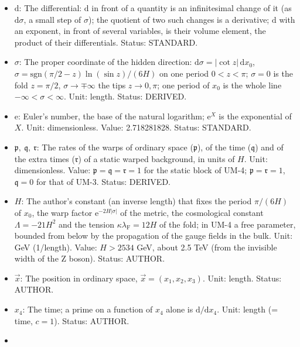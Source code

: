 \documentclass[
  10pt,
]{article}
\providecommand{\tightlist}{%
  \setlength{\itemsep}{0pt}\setlength{\parskip}{0pt}}
\begin{document}
\begin{itemize}
\tightlist
\item
  \(\mathrm{d}\): The differential: \(\mathrm{d}\) in front of a
  quantity is an infinitesimal change of it (as \(\mathrm{d}\sigma\), a
  small step of \(\sigma\)); the quotient of two such changes is a
  derivative; \(\mathrm{d}\) with an exponent, in front of several
  variables, is their volume element, the product of their
  differentials. Status: STANDARD.
\item
  \(\sigma\): The proper coordinate of the hidden direction:
  \(\mathrm{d}\sigma = \lvert\cot z\rvert\,\mathrm{d}x_0\),
  \(\sigma = \mathrm{sgn}(\pi/2 - z)\ln(\sin z)/(6H)\) on one period
  \(0 < z < \pi\); \(\sigma = 0\) is the fold \(z = \pi/2\),
  \(\sigma \to \mp\infty\) the tips \(z \to 0, \pi\); one period of
  \(x_0\) is the whole line \(-\infty < \sigma < \infty\). Unit: length.
  Status: DERIVED.
\item
  \(\mathrm{e}\): Euler's number, the base of the natural logarithm;
  \(\mathrm{e}^{X}\) is the exponential of \(X\). Unit: dimensionless.
  Value: 2.718281828. Status: STANDARD.
\item
  \(\mathfrak{p},\ \mathfrak{q},\ \mathfrak{r}\): The rates of the warps
  of ordinary space (\(\mathfrak{p}\)), of the time (\(\mathfrak{q}\))
  and of the extra times (\(\mathfrak{r}\)) of a static warped
  background, in units of \(H\). Unit: dimensionless. Value:
  \(\mathfrak{p} = \mathfrak{q} = \mathfrak{r} = 1\) for the static
  block of UM-4; \(\mathfrak{p} = \mathfrak{r} = 1\),
  \(\mathfrak{q} = 0\) for that of UM-3. Status: DERIVED.
\item
  \(H\): The author's constant (an inverse length) that fixes the period
  \(\pi/(6H)\) of \(x_0\), the warp factor
  \(\mathrm{e}^{-2H\lvert\sigma\rvert}\) of the metric, the cosmological
  constant \(\Lambda = -21H^2\) and the tension
  \(\kappa\lambda_{\mathrm{F}} = 12H\) of the fold; in UM-4 a free
  parameter, bounded from below by the propagation of the gauge fields
  in the bulk. Unit: GeV (1/length). Value: \(H > 2534\) GeV, about 2.5
  TeV (from the invisible width of the Z boson). Status: AUTHOR.
\item
  \(\vec x\): The position in ordinary space,
  \(\vec x = (x_1, x_2, x_3)\). Unit: length. Status: AUTHOR.
\item
  \(x_4\): The time; a prime on a function of \(x_4\) alone is
  \(\mathrm{d}/\mathrm{d}x_4\). Unit: length (= time, \(c = 1\)).
  Status: AUTHOR.
\item

\end{itemize}
\end{document}
